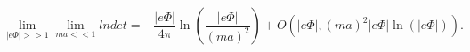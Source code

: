 \begin{equation}
\label{Eq_0504}
\lim_{|e\Phi| >> 1} \lim_{ma << 1} lndet
  = -\frac{|e\Phi|}{4\pi} \ln\left(\frac{|e\Phi|}{(ma)^2}\right)
    + O(|e\Phi|,(ma)^2|e\Phi|\ln(|e\Phi|)).
\end{equation}

